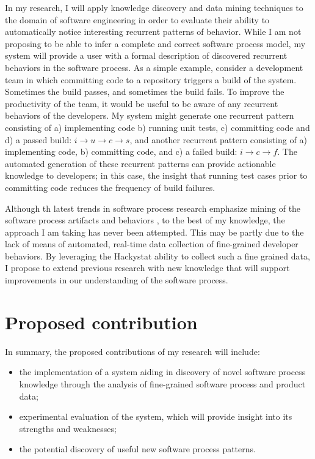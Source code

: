 In my research, I will apply knowledge discovery and data mining techniques to the domain of software engineering in order to evaluate their ability to automatically notice interesting recurrent patterns of behavior. While I am not proposing to be able to infer a complete and correct software process model, my system will provide a user with a formal description of discovered recurrent behaviors in the software process. As a simple example, consider a development team in which committing code to a repository triggers a build of the system. Sometimes the build passes, and sometimes the build fails. To improve the productivity of the team, it would be useful to be aware of any recurrent behaviors of the developers. My system might generate one recurrent pattern consisting of a) implementing code b) running unit tests, c) committing code and d) a passed build: $i \rightarrow u \rightarrow c \rightarrow s $, and another recurrent pattern consisting of a) implementing code, b) committing code, and c) a failed build: $i \rightarrow c \rightarrow f $. The automated generation of these recurrent patterns can provide actionable knowledge to developers; in this case, the insight that running test cases prior to committing code reduces the frequency of build failures.

Although th latest trends in software process research emphasize mining of the software process artifacts and behaviors \cite{citeulike:5043664} \cite{citeulike:1885717} \cite{citeulike:5112229} \cite{citeulike:1885717}, to the best of my knowledge, the approach I am taking has never been attempted. This may be partly due to the lack of means of automated, real-time data collection of fine-grained developer behaviors. By leveraging the Hackystat ability to collect such a fine grained data, I propose to extend previous research with new knowledge that will support improvements in our understanding of the software process.

\section{Proposed contribution}
In summary, the proposed contributions of my research will include: 
\begin{itemize}
	\item the implementation of a system aiding in discovery of novel software process knowledge through the analysis of fine-grained software process and product data;
	\item experimental evaluation of the system, which will provide insight into its strengths and weaknesses;
	\item the potential discovery of useful new software process patterns.
\end{itemize}


